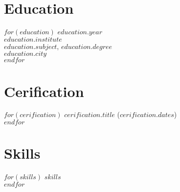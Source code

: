 \documentclass[$fontsize$, a4paper]{article}
\begin{document}
\vspace{-10pt}

\begin{multicols}{2}

\section*{Education}
\noindent
$for(education)$
\footnotesize{$education.year$}\\
\emph{$education.institute$}\\
\textbf{$education.subject$}, $education.degree$\\
$education.city$\\[.2cm]
$endfor$

\columnbreak

\section*{Cerification}
$for(cerification)$
\href{$cerification.url$}{$cerification.title$} ($cerification.dates$)\\
$endfor$

\section*{Skills}
$for(skills)$
$skills$\\
$endfor$

\end{multicols}
\end{document}
